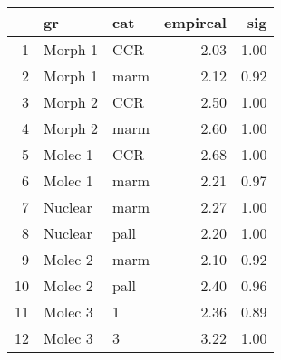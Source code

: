 \begin{table}[ht]
\centering
\begin{tabular}{rllrr}
  \hline
 & gr & cat & empircal & sig \\ 
  \hline
1 & Morph 1 & CCR & 2.03 & 1.00 \\ 
  2 & Morph 1 & marm & 2.12 & 0.92 \\ 
  3 & Morph 2 & CCR & 2.50 & 1.00 \\ 
  4 & Morph 2 & marm & 2.60 & 1.00 \\ 
  5 & Molec 1 & CCR & 2.68 & 1.00 \\ 
  6 & Molec 1 & marm & 2.21 & 0.97 \\ 
  7 & Nuclear & marm & 2.27 & 1.00 \\ 
  8 & Nuclear & pall & 2.20 & 1.00 \\ 
  9 & Molec 2 & marm & 2.10 & 0.92 \\ 
  10 & Molec 2 & pall & 2.40 & 0.96 \\ 
  11 & Molec 3 & 1 & 2.36 & 0.89 \\ 
  12 & Molec 3 & 3 & 3.22 & 1.00 \\ 
   \hline
\end{tabular}
\label{mmmiss}
\end{table}
